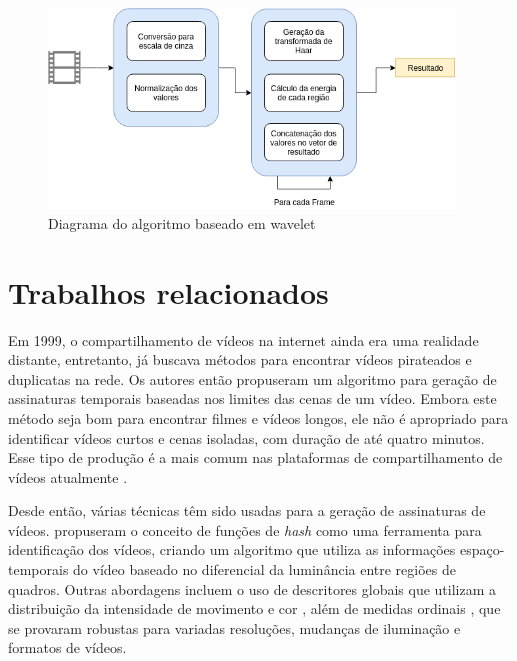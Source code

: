  \begin{figure}[h]
      \centering
      \includegraphics[width=0.96\textwidth]{dados/figuras/Wavelet.png}
      \caption{Diagrama do algoritmo baseado em wavelet}
       	\label{fig:dia_wavelet}
    \end{figure}  


\section{Trabalhos relacionados}
\label{chap:relacionados}



Em 1999, o compartilhamento de vídeos na internet ainda era uma realidade distante, entretanto, \citeauthor{indyk1999finding} já buscava métodos para encontrar vídeos pirateados e duplicatas na rede. Os autores então propuseram um algoritmo para geração de assinaturas temporais baseadas nos limites das cenas de um vídeo. Embora este método seja bom para encontrar filmes e vídeos longos, ele não é apropriado para identificar vídeos curtos e cenas isoladas, com duração de até quatro minutos. Esse tipo de produção é a mais comum nas plataformas de compartilhamento de vídeos atualmente \citeauthor{comscoreinc}.

Desde então, várias técnicas têm sido usadas para a geração de assinaturas de vídeos. \citeauthor{coskun2006spatio} propuseram o conceito de funções de \textit{hash} como uma ferramenta para identificação dos vídeos, criando um algoritmo que utiliza as informações espaço-temporais do vídeo baseado no diferencial da luminância entre regiões de quadros. Outras abordagens incluem o uso de descritores globais que utilizam a distribuição da intensidade de movimento e cor \citeauthor{hampapur2001comparison}, além de medidas ordinais \citeauthor{hua2004robust}, que se provaram robustas para variadas resoluções, mudanças de iluminação e formatos de vídeos.	   	

